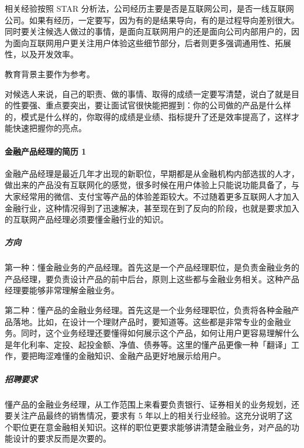 \documentclass[letterpaper,10pt,english]{sphinxmanual}
\begin{document}
相关经验按照 STAR
分析法，公司经历主要是否是互联网公司，是否一线互联网公司。如果有经历，一定要写，因为有的是结果导向，有的是过程导向差别很大。同时要关注候选人做过的事情，是面向互联网用户的还是面向公司内部用户的，因为面向互联网用户更关注用户体验这些细节部分，后者则更多强调通用性、拓展性，以及开发效率。

教育背景主要作为参考。

对候选人来说，自己的职责、做的事情、取得的成绩一定要写清楚，说白了就是目的性要强、重点要突出，要让面试官很快能把握到：你的公司做的产品是什么样的，模式是什么样的，你取得的成绩是业绩、指标提升了还是效率提高了，这样才能快速把握你的亮点。


\paragraph{金融产品经理的简历 1\sphinxfootnotemark[846]}
\label{\detokenize{chapter_interview/AI_Finance_CV:id1}}\label{\detokenize{chapter_interview/AI_Finance_CV::doc}}%
\begin{footnotetext}[846]\sphinxAtStartFootnote
{}
%
\end{footnotetext}\ignorespaces 
金融产品经理是最近几年才出现的新职位，早期都是从金融机构内部选拔的人才，做出来的产品没有互联网化的感觉，很多时候在用户体验上只能说功能具备了，与大家经常用的微信、支付宝等产品的体验差距较大。不过随着更多互联网人才加入金融行业，这种情况得到了迅速解决，甚至现在到了反向的阶段，也就是要求加入的互联网产品经理必须要懂金融行业的知识。


\subparagraph{方向}
\label{\detokenize{chapter_interview/AI_Finance_CV:id2}}
第一种：懂金融业务的产品经理。首先这是一个产品经理职位，是负责金融业务的产品经理，要负责设计产品的前中后台，原则上这些都与金融业务相关。这种产品经理要能够非常理解金融业务。

第二种：懂产品的金融业务经理。首先这是一个业务经理职位，负责将各种金融产品落地。比如，在设计一个理财产品时，要知道等。这些都是非常专业的金融业务。同时，这个业务经理还要懂得如何展示这个产品，如何让用户更容易理解什么是年化利率、定投、起投金额、净值、债券等。这里的懂产品更像一种「翻译」工作，要把晦涩难懂的金融知识、金融产品更好地展示给用户。


\subparagraph{招聘要求}
\label{\detokenize{chapter_interview/AI_Finance_CV:id3}}
懂产品的金融业务经理，从工作范围上来看要负责银行、证券相关的业务规划，还要关注产品最终的销售情况，要求有
5
年以上的相关行业经验。这充分说明了这个职位更在意金融相关知识。这样的职位更要求能够讲清楚金融业务，对产品的功能设计的要求反而是次要的。
\end{document}
